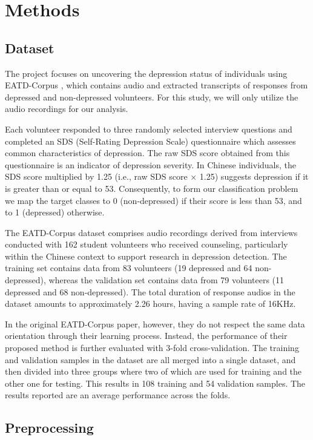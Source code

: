 
\section{Methods}\label{sec:methods}


\subsection{Dataset}

The project focuses on uncovering the depression status of individuals using EATD-Corpus \cite{shen2022automatic}, which contains audio and extracted transcripts of responses from depressed and non-depressed volunteers. For this study, we will only utilize the audio recordings for our analysis.

Each volunteer responded to three randomly selected interview questions and completed an SDS (Self-Rating Depression Scale) questionnaire which assesses common characteristics of depression. The raw SDS score obtained from this questionnaire is an indicator of depression severity. In Chinese individuals, the SDS score multiplied by 1.25 (i.e., raw SDS score × 1.25) suggests depression if it is greater than or equal to 53. Consequently, to form our classification problem we map the target classes to 0 (non-depressed) if their score is less than 53, and to 1 (depressed) otherwise.

The EATD-Corpus dataset comprises audio recordings derived from interviews conducted with 162 student volunteers who received counseling, particularly within the Chinese context to support research in depression detection. The training set contains data from 83 volunteers (19 depressed and 64 non-depressed), whereas the validation set contains data from 79 volunteers (11 depressed and 68 non-depressed). The total duration of response audios in the dataset amounts to approximately 2.26 hours, having a sample rate of 16KHz.

In the original EATD-Corpus paper, however, they do not respect the same data orientation through their learning process. Instead, the performance of their proposed method is further evaluated with 3-fold cross-validation. The training and validation samples in the dataset are all merged into a single dataset, and then divided into three groups where two of which are used for training and the other one for testing. This results in 108 training and 54 validation samples. The results reported are an average performance across the folds.


\subsection{Preprocessing}

